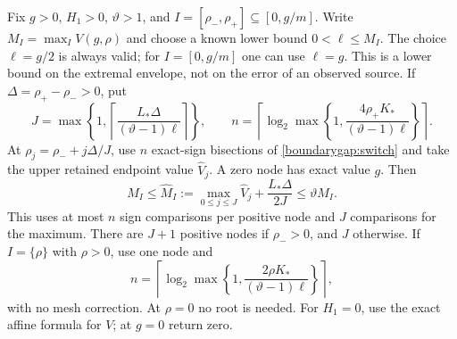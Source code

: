 \begin{proposition}
\label{boundarygap:budget}\label{joint:budget}
Fix $g>0$, $H_1>0$, $\vartheta>1$, and
$I=[\rho_-,\rho_+]\subseteq[0,g/m]$.
Write $M_I=\max_I V(g,\rho)$ and choose a known lower bound
$0<\ell\le M_I$. The choice $\ell=g/2$ is always valid; for
$I=[0,g/m]$ one can use $\ell=g$. This is a lower bound on the
extremal envelope, not on the error of an observed source.
If $\Delta=\rho_+-\rho_->0$, put
\begin{equation}\label{compact:interval-budget}
 J=\max\left\{1,\left\lceil
       \frac{L_*\Delta}{(\vartheta-1)\ell}\right\rceil\right\},
 \qquad
 n=\left\lceil\log_2\max\left\{1,
       \frac{4\rho_+K_*}{(\vartheta-1)\ell}\right\}\right\rceil.
\end{equation}
At $\rho_j=\rho_-+j\Delta/J$, use $n$ exact-sign bisections of
\eqref{boundarygap:switch} and take the upper retained endpoint
value $\widehat V_j$. A zero node has exact value $g$. Then
\begin{equation}\label{boundarygap:finite-enclosure}
 M_I\le\widehat M_I:=
 \max_{0\le j\le J}\widehat V_j+\frac{L_*\Delta}{2J}
 \le\vartheta M_I.
\end{equation}
This uses at most $n$ sign comparisons per positive node and $J$
comparisons for the maximum. There are $J+1$ positive nodes if
$\rho_->0$, and $J$ otherwise.
If $I=\{\rho\}$ with $\rho>0$, use one node and
\begin{equation}\label{energy:scalar-budget}
 n=\left\lceil\log_2\max\left\{1,
       \frac{2\rho K_*}{(\vartheta-1)\ell}\right\}\right\rceil,
\end{equation}
with no mesh correction. At $\rho=0$ no root is needed.
For $H_1=0$, use the exact affine formula for $V$; at $g=0$ return zero.
\end{proposition}


